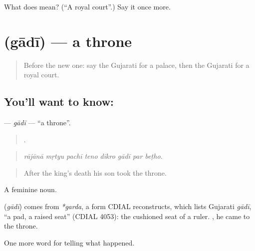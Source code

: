 \begin{tcolorbox}[breakable,colback=teal!4,colframe=teal!35!black,title={Before you move on}]
What does  mean? (\textquotedblleft{}A royal court\textquotedblright{}.) Say it once more.
\end{tcolorbox}
\section[\texorpdfstring{\gu{ગાદી} (gādī)}{ગાદી (gādī)}]{ (gādī) — a throne}

\label{lesson:GU-C318-gadi}



\begin{quote}
Before the new one: say the Gujarati for a palace, then the Gujarati for a royal court.
\end{quote}

\subsection*{You'll want to know: }
\textbf{} — \emph{gādī} — \textquotedblleft{}a throne\textquotedblright{}.

\begin{quote}
       .
\end{quote}

\begin{quote}
\emph{rājānā mṛtyu pachī teno dīkro gādī par beṭho.}
\end{quote}

\begin{quote}
After the king's death his son took the throne.
\end{quote}

A feminine noun.

\begin{cousinweb}
\textbf{} (\emph{gādī}) comes from \emph{*garda}, a form CDIAL reconstructs, which lists Gujarati \emph{gādī}, \textquotedblleft{}a pad, a raised seat\textquotedblright{} (CDIAL 4053): the cushioned seat of a ruler. \textbf{  }, he came to the throne.
\end{cousinweb}

\begin{grammarlens}[title={What you've built}]
One more word for telling what happened.
\end{grammarlens}

